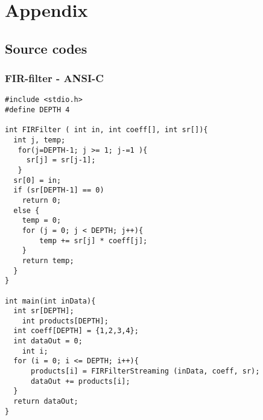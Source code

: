 \chapter{Appendix}

\section{\label{sec:sourcecode}Source codes}

\subsection{FIR-filter - ANSI-C}
\begin{lstlisting}[caption=FIR-filter implemented in C]
#include <stdio.h>
#define DEPTH 4

int FIRFilter ( int in, int coeff[], int sr[]){
  int j, temp;
   for(j=DEPTH-1; j >= 1; j-=1 ){
     sr[j] = sr[j-1];
   }
  sr[0] = in;
  if (sr[DEPTH-1] == 0)
    return 0;
  else {
    temp = 0;
    for (j = 0; j < DEPTH; j++){
        temp += sr[j] * coeff[j];
    }
    return temp;
  }
}

int main(int inData){
  int sr[DEPTH];
	int products[DEPTH];
  int coeff[DEPTH] = {1,2,3,4};
  int dataOut = 0;
	int i;
  for (i = 0; i <= DEPTH; i++){
      products[i] = FIRFilterStreaming (inData, coeff, sr);
      dataOut += products[i];
  }
  return dataOut;
}
\end{lstlisting}

